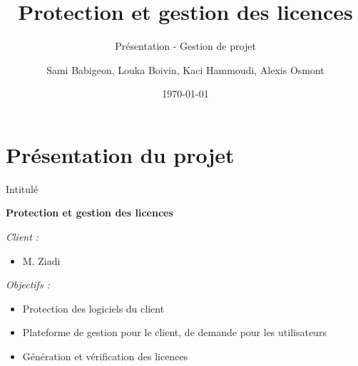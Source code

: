 \documentclass{cubeamer}
\title{Protection et gestion des licences}
\subtitle{Présentation - Gestion de projet}
\author{Sami Babigeon, Louka Boivin, Kaci Hammoudi, Alexis Osmont}
\date{\today}
\institute[Université de Rouen]{Master Informatique - 1ère année}
\begin{document}
\maketitle
\cutoc

%
%



\section{Présentation du projet}

\begin{frame}{Intitulé}
    \centerline{\textbf{Protection et gestion des licences}}
    \medskip
    \emph{Client :}
    \begin{itemize}
        \item M. Ziadi
    \end{itemize}
    \emph{Objectifs :}
    \begin{itemize}
        \item Protection des logiciels du client
        \item Plateforme de gestion pour le client, de demande pour les utilisateurs
        \item Génération et vérification des licences
    \end{itemize}
\end{frame}
\end{document}
